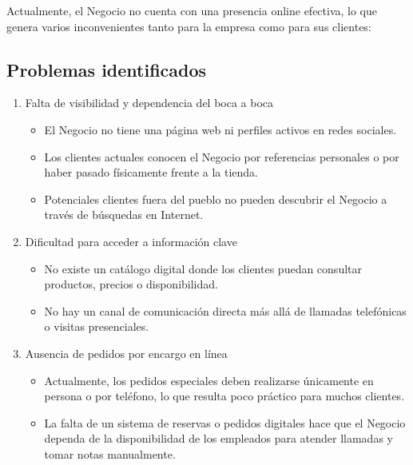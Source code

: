 \documentclass[a4paper]{article}
\newcommand{\textgap}{\vspace{1em}}
\begin{document}
\textgap

Actualmente, el Negocio no cuenta con una presencia online efectiva, lo que genera varios inconvenientes tanto para la empresa como para sus clientes:

\subsection{Problemas identificados}
\begin{enumerate}

    \item Falta de visibilidad y dependencia del boca a boca
    \begin{itemize}

        \item El Negocio no tiene una página web ni perfiles activos en redes sociales.

        \item Los clientes actuales conocen el Negocio por referencias personales o por haber pasado físicamente frente a la tienda.

        \item Potenciales clientes fuera del pueblo no pueden descubrir el Negocio a través de búsquedas en Internet.

    \end{itemize}


    \item Dificultad para acceder a información clave
    \begin{itemize}

        \item No existe un catálogo digital donde los clientes puedan consultar productos, precios o disponibilidad.

        \item No hay un canal de comunicación directa más allá de llamadas telefónicas o visitas presenciales.

    \end{itemize}


    \item Ausencia de pedidos por encargo en línea
    \begin{itemize}

        \item Actualmente, los pedidos especiales deben realizarse únicamente en persona o por teléfono, lo que resulta poco práctico para muchos clientes.

        \item La falta de un sistema de reservas o pedidos digitales hace que el Negocio dependa de la disponibilidad de los empleados para atender llamadas y tomar notas manualmente.


\end{itemize}
\end{enumerate}
\end{document}
